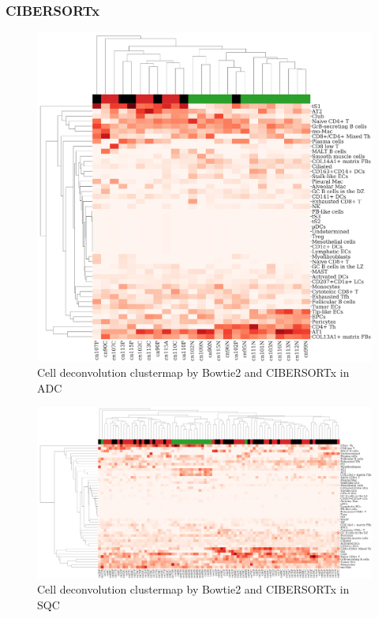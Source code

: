 \documentclass[a4paper]{article}
\begin{document}
            \subsubsection{CIBERSORTx}
                \begin{figure}[htbp]
                    \centering
                    \includegraphics[width=0.6 \linewidth]{figures/CIBERSORTx/clustermap/Bowtie2.ADC.cluster.pdf}
                    \caption{Cell deconvolution clustermap by Bowtie2 and CIBERSORTx in ADC}
                    \label{fig:Deconvolution-CIBERSORTx-Bowtie2-cluster-ADC}
                \end{figure}

                \begin{figure}[htbp]
                    \centering
                    \includegraphics[width=\linewidth]{figures/CIBERSORTx/clustermap/Bowtie2.SQC.cluster.pdf}
                    \caption{Cell deconvolution clustermap by Bowtie2 and CIBERSORTx in SQC}
                    \label{fig:Deconvolution-CIBERSORTx-Bowtie2-cluster-SQC}
                \end{figure}
\end{document}
